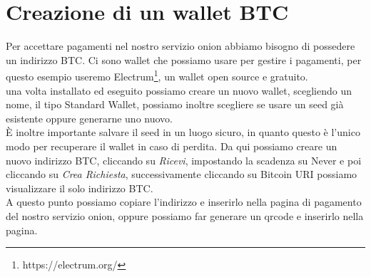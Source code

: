 \section{Creazione di un wallet BTC}
Per accettare pagamenti nel nostro servizio onion abbiamo bisogno di possedere un indirizzo BTC. 
Ci sono wallet che possiamo usare per gestire i pagamenti, per questo esempio useremo Electrum\footnote{https://electrum.org/}, un wallet open source e gratuito.\\
una volta installato ed eseguito possiamo creare un nuovo wallet, scegliendo un nome, il tipo Standard Wallet, possiamo inoltre scegliere se usare un seed già esistente oppure generarne uno nuovo.\\
È inoltre importante salvare il seed in un luogo sicuro, in quanto questo è l'unico modo per recuperare il wallet in caso di perdita.
Da qui possiamo creare un nuovo indirizzo BTC, cliccando su \textit{Ricevi}, impostando la scadenza su Never e poi cliccando su \textit{Crea Richiesta}, successivamente cliccando su Bitcoin URI possiamo visualizzare il solo indirizzo BTC. 
\\
A questo punto possiamo copiare l'indirizzo e inserirlo nella pagina di pagamento del nostro servizio onion, oppure possiamo far generare un qrcode e inserirlo nella pagina.
